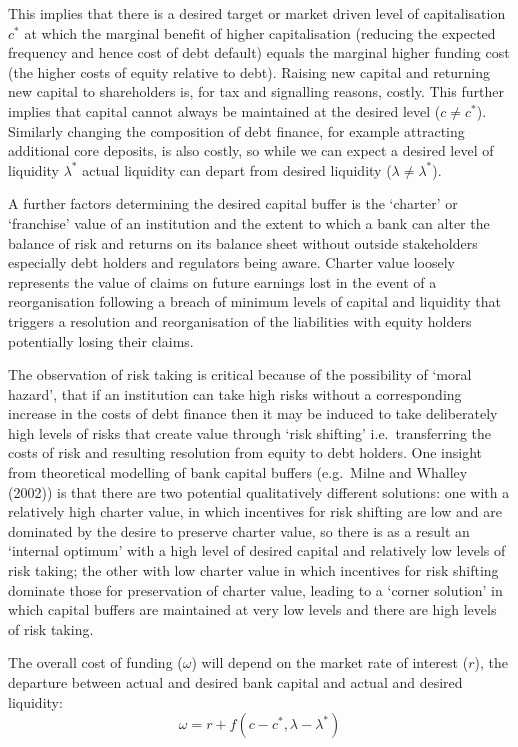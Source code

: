 \documentclass[
]{article}
\begin{document}
This implies that there is a desired target or market driven level of capitalisation \(c^\ast\) at which the marginal benefit of higher capitalisation (reducing the expected frequency and hence cost of debt default) equals the marginal higher funding cost (the higher costs of equity relative to debt). Raising new capital and returning new capital to shareholders is, for tax and signalling reasons, costly. This further implies that capital cannot always be maintained at the desired level (\(c \neq c^\ast\)). Similarly changing the composition of debt finance, for example attracting additional core deposits, is also costly, so while we can expect a desired level of liquidity \(\lambda^\ast\) actual liquidity can depart from desired liquidity (\(\lambda \neq \lambda^\ast\)).

A further factors determining the desired capital buffer is the `charter' or `franchise' value of an institution and the extent to which a bank can alter the balance of risk and returns on its balance sheet without outside stakeholders especially debt holders and regulators being aware. Charter value loosely represents the value of claims on future earnings lost in the event of a reorganisation following a breach of minimum levels of capital and liquidity that triggers a resolution and reorganisation of the liabilities with equity holders potentially losing their claims.

The observation of risk taking is critical because of the possibility of `moral hazard', that if an institution can take high risks without a corresponding increase in the costs of debt finance then it may be induced to take deliberately high levels of risks that create value through `risk shifting' i.e.~transferring the costs of risk and resulting resolution from equity to debt holders. One insight from theoretical modelling of bank capital buffers (e.g.~Milne and Whalley (2002)) is that there are two potential qualitatively different solutions: one with a relatively high charter value, in which incentives for risk shifting are low and are dominated by the desire to preserve charter value, so there is as a result an `internal optimum' with a high level of desired capital and relatively low levels of risk taking; the other with low charter value in which incentives for risk shifting dominate those for preservation of charter value, leading to a `corner solution' in which capital buffers are maintained at very low levels and there are high levels of risk taking.

The overall cost of funding (\(\omega\)) will depend on the market rate of interest (\(r\)), the departure between actual and desired bank capital and actual and desired liquidity:
\[
\omega=r+f(c-c^\ast,\lambda-\lambda^\ast ) 
\]
\end{document}
